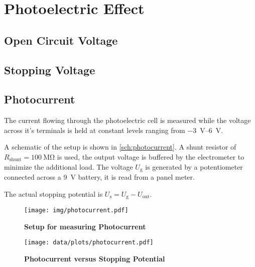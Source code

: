 \chapter{Photoelectric Effect}


\section{Open Circuit Voltage}%


\section{Stopping Voltage}%


\section{Photocurrent}%

The current flowing through the photoelectric cell is measured while the voltage across it's terminals is held at constant levels ranging from \SIrange{-3}{6}{\volt}.

A schematic of the setup is shown in \autoref{sch:photocurrent}.
A shunt resistor of $R_\text{shunt} = \SI{100}{\mega\ohm}$ is used, the output voltage is buffered by the electrometer to minimize the additional load.
The voltage $U_\text{g}$ is generated by a potentiometer connected across a \SI{9}{\volt} battery, it is read from a panel meter.

The actual stopping potential is $U_\text{s} = U_\text{g} - U_\text{out}$.

\begin{figure}[tbp]
	\centering
	\texttt{[image: img/photocurrent.pdf]}
	\caption[Setup for measuring Photocurrent]{\textbf{Setup for measuring Photocurrent}}
	\label{sch:photocurrent}
\end{figure}

\begin{figure}[tbp]
	\centering
	\texttt{[image: data/plots/photocurrent.pdf]}
	\caption[Photocurrent versus Stopping Potential]{\textbf{Photocurrent versus Stopping Potential}}
	\label{plt:photocurrent}
\end{figure}
